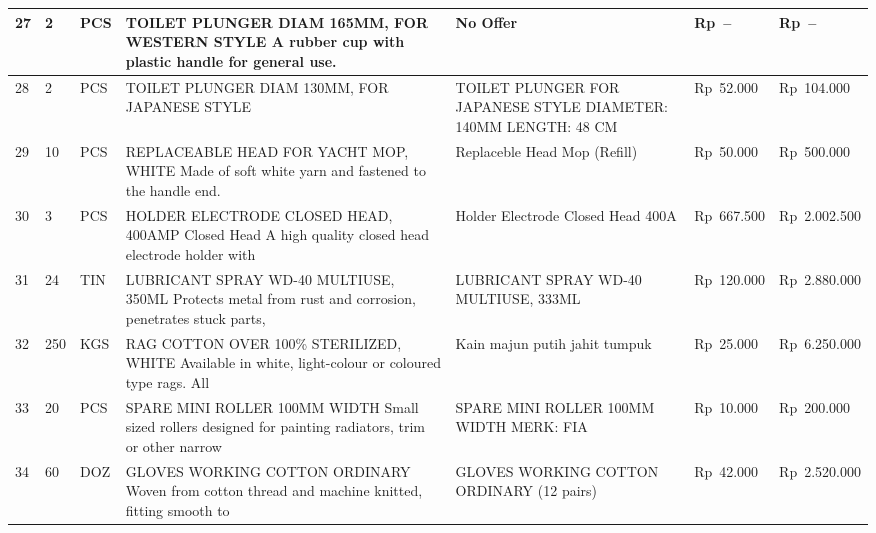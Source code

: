 \documentclass[9pt,a4paper,landscape]{article}
\begin{document}
\begin{longtable}{|C{0.6cm}|C{0.6cm}|C{0.8cm}|L{8.0cm}|L{9.5cm}|R{2.5cm}|R{2.5cm}|}
27 & 2 & PCS &
  TOILET PLUNGER DIAM 165MM, FOR WESTERN STYLE\newline
  A rubber cup with plastic handle for general use. &
  \textcolor[gray]{0.5}{No Offer} &
  \textcolor[gray]{0.5}{Rp~--} & \textcolor[gray]{0.5}{Rp~--} \\
\hline

28 & 2 & PCS &
  TOILET PLUNGER DIAM 130MM, FOR JAPANESE STYLE &
  TOILET PLUNGER FOR JAPANESE STYLE\newline
  DIAMETER: 140MM\newline
  LENGTH: 48 CM &
  Rp~52.000 & Rp~104.000 \\
\hline

29 & 10 & PCS &
  REPLACEABLE HEAD FOR YACHT MOP, WHITE\newline
  Made of soft white yarn and fastened to the handle end. &
  Replaceble Head Mop (Refill) &
  Rp~50.000 & Rp~500.000 \\
\hline

30 & 3 & PCS &
  HOLDER ELECTRODE CLOSED HEAD, 400AMP\newline
  Closed Head A high quality closed head electrode\newline
  holder with &
  Holder Electrode Closed Head 400A &
  Rp~667.500 & Rp~2.002.500 \\
\hline

31 & 24 & TIN &
  LUBRICANT SPRAY WD-40 MULTIUSE, 350ML\newline
  Protects metal from rust and corrosion,\newline
  penetrates stuck parts, &
  LUBRICANT SPRAY WD-40 MULTIUSE, 333ML &
  Rp~120.000 & Rp~2.880.000 \\
\hline

32 & 250 & KGS &
  RAG COTTON OVER 100\% STERILIZED, WHITE\newline
  Available in white, light-colour or coloured type rags. All &
  Kain majun putih jahit tumpuk &
  Rp~25.000 & Rp~6.250.000 \\
\hline

33 & 20 & PCS &
  SPARE MINI ROLLER 100MM WIDTH\newline
  Small sized rollers designed for painting radiators,\newline
  trim or other narrow &
  SPARE MINI ROLLER 100MM WIDTH\newline
  MERK: FIA &
  Rp~10.000 & Rp~200.000 \\
\hline

34 & 60 & DOZ &
  GLOVES WORKING COTTON ORDINARY\newline
  Woven from cotton thread and machine knitted,\newline
  fitting smooth to &
  GLOVES WORKING COTTON ORDINARY (12 pairs) &
  Rp~42.000 & Rp~2.520.000 \\
\hline


\end{longtable}
\end{document}
